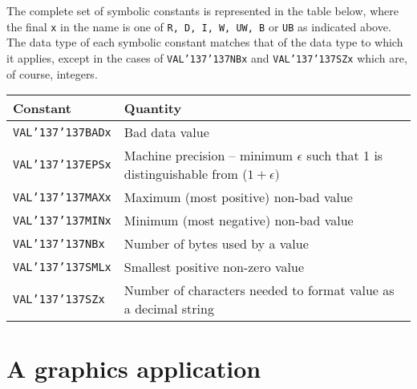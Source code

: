 \documentclass[twoside,11pt]{article}
\renewcommand{\_}{{\tt\char'137}}
\newcommand{\xlabel}[1]{}
\begin{document}
The complete set of symbolic constants is represented in the table below,
where the final {\tt x}  in the name is one of 
{\tt R, D, I, W, UW, B} or {\tt UB}  as indicated above.
The data type of each symbolic constant matches that of the 
data type to which it applies, except in the cases of
{\tt VAL\_\_NBx} and {\tt VAL\_\_SZx} which are, of course, integers.
\begin{center}
\begin{tabular}{|l|l|} \hline
{\bf Constant   }& {\bf Quantity }\\ \hline
{\tt VAL\_\_BADx}        & Bad data value\\
{\tt VAL\_\_EPSx}        & Machine precision -- minimum $\epsilon$ such that 
1 is distinguishable from ($1+\epsilon)$\\
{\tt VAL\_\_MAXx}        & Maximum (most positive) non-bad value\\ 
{\tt VAL\_\_MINx}        & Minimum (most negative) non-bad value\\
{\tt VAL\_\_NBx}         & Number of bytes used by a value\\
{\tt VAL\_\_SMLx}        & Smallest positive non-zero value\\
{\tt VAL\_\_SZx}         & Number of characters needed to format value as a decimal string\\
\hline
\end{tabular}
\end{center}

\newpage
\section{A graphics application\label{graph}\xlabel{a_graphics_application}}
\end{document}
